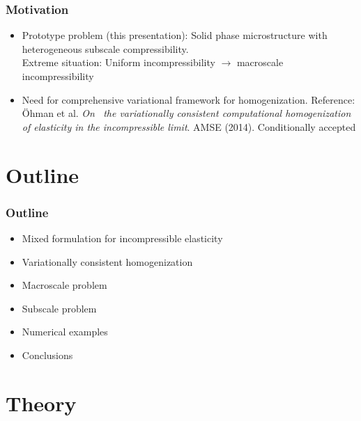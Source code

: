 \documentclass[11pt]{beamer} %
\begin{document}
\begin{frame}
 \frametitle{Motivation}
  \begin{itemize}
  \item Prototype problem (this presentation): Solid phase microstructure with heterogeneous subscale compressibility.
 \\
 Extreme situation: Uniform incompressibility $\rightarrow$ macroscale incompressibility

 \item Need for comprehensive variational framework for homogenization.
     Reference: Öhman et al.
    \textit{On \ the variationally consistent computational homogenization of elasticity in the incompressible limit}.
     AMSE (2014). Conditionally accepted
  \end{itemize}
\end{frame}

\section{Outline}
\begin{frame}
 \frametitle{Outline}
\begin{itemize}
 \item Mixed formulation for incompressible elasticity
 \item Variationally consistent homogenization
 \item Macroscale problem
 \item Subscale problem
 \item Numerical examples
 \item Conclusions
\end{itemize}
\end{frame}

\section{Theory}
\end{document}
